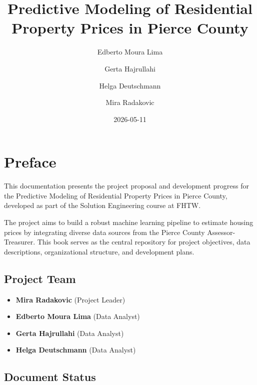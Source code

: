 \documentclass[
  english,
  letterpaper,
  DIV=11,
  numbers=noendperiod]{scrreprt}
\title{Predictive Modeling of Residential Property Prices in Pierce
County}
\author{Edberto Moura Lima \and Gerta Hajrullahi \and Helga
Deutschmann \and Mira Radakovic}
\date{2026-05-11}
\providecommand{\tightlist}{%
  \setlength{\itemsep}{0pt}\setlength{\parskip}{0pt}}
\renewcommand*\contentsname{Table of contents}
\newcommand\contentsname{Table of contents}
\begin{document}
\maketitle

\renewcommand*\contentsname{Table of contents}
{
\setcounter{tocdepth}{2}
\tableofcontents
}


\chapter*{Preface}\label{preface}


This documentation presents the project proposal and development
progress for the Predictive Modeling of Residential Property Prices in
Pierce County, developed as part of the Solution Engineering course at
FHTW.

The project aims to build a robust machine learning pipeline to estimate
housing prices by integrating diverse data sources from the Pierce
County Assessor-Treasurer. This book serves as the central repository
for project objectives, data descriptions, organizational structure, and
development plans.

\section*{Project Team}\label{project-team}


\begin{itemize}
\tightlist
\item
  \textbf{Mira Radakovic} (Project Leader)
\item
  \textbf{Edberto Moura Lima} (Data Analyst)
\item
  \textbf{Gerta Hajrullahi} (Data Analyst)
\item
  \textbf{Helga Deutschmann} (Data Analyst)
\end{itemize}

\section*{Document Status}\label{document-status}

\end{document}
